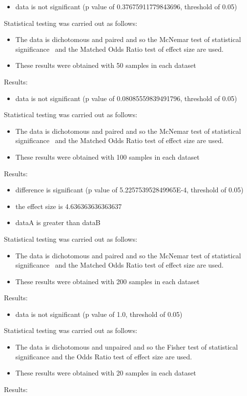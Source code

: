 \documentclass[]{article}
\begin{document}
\begin{itemize}
\item{data is not significant (p value of 0.37675911779843696, threshold of 0.05)}
\end{itemize}Statistical testing was carried out as follows: \begin{itemize}
\item{The data is dichotomous and paired and so the McNemar test of statistical significance~\cite{Gibbons2011} and the Matched Odds Ratio test of effect size are used.}
\item{These results were obtained with 50 samples in each dataset}
\end{itemize}Results:
\begin{itemize}
\item{data is not significant (p value of 0.08085559839491796, threshold of 0.05)}
\end{itemize}Statistical testing was carried out as follows: \begin{itemize}
\item{The data is dichotomous and paired and so the McNemar test of statistical significance~\cite{Gibbons2011} and the Matched Odds Ratio test of effect size are used.}
\item{These results were obtained with 100 samples in each dataset}
\end{itemize}Results:
\begin{itemize}
\item{difference is significant (p value of 5.225753952849965E-4, threshold of 0.05)}
\item{the effect size is 4.636363636363637}
\item{dataA is greater than dataB}
\end{itemize}Statistical testing was carried out as follows: \begin{itemize}
\item{The data is dichotomous and paired and so the McNemar test of statistical significance~\cite{Gibbons2011} and the Matched Odds Ratio test of effect size are used.}
\item{These results were obtained with 200 samples in each dataset}
\end{itemize}Results:
\begin{itemize}
\item{data is not significant (p value of 1.0, threshold of 0.05)}
\end{itemize}Statistical testing was carried out as follows: \begin{itemize}
\item{The data is dichotomous and unpaired and so the Fisher test of statistical significance and the Odds Ratio test of effect size are used.}
\item{These results were obtained with 20 samples in each dataset}
\end{itemize}Results:
\end{document}
